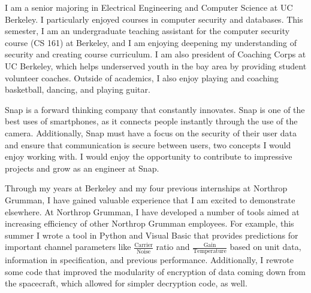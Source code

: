 \documentclass[11pt, a4paper]{awesome-cv}
\begin{document}
\makecvheader

\makelettertitle

\begin{cvletter}
I am a senior majoring in Electrical Engineering and Computer Science at UC Berkeley. I particularly enjoyed courses in computer security and databases. This semester, I am an undergraduate teaching assistant for the computer security course (CS 161) at Berkeley, and I am enjoying deepening my understanding of security and creating course curriculum. I am also president of Coaching Corps at UC Berkeley, which helps underserved youth in the bay area by providing student volunteer coaches. Outside of academics, I also enjoy playing and coaching basketball, dancing, and playing guitar.

Snap is a forward thinking company that constantly innovates. Snap is one of the best uses of smartphones, as it connects people instantly through the use of the camera. Additionally, Snap must have a focus on the security of their user data and ensure that communication is secure between users, two concepts I would enjoy working with. I would enjoy the opportunity to contribute to impressive projects and grow as an engineer at Snap.

Through my years at Berkeley and my four previous internships at Northrop Grumman, I have gained valuable experience that I am excited to demonstrate elsewhere. At Northrop Grumman, I have developed a number of tools aimed at increasing efficiency of other Northrop Grumman employees. For example, this summer I wrote a tool in Python and Visual Basic that provides predictions for important channel parameters like $\frac{\text{Carrier}}{\text{Noise}}$ ratio and $\frac{\text{Gain}}{\text{Temperature}}$ based on unit data, information in specification, and previous performance. Additionally, I rewrote some code that improved the modularity of encryption of data coming down from the spacecraft, which allowed for simpler decryption code, as well.

\end{cvletter}

\makeletterclosing
\end{document}
